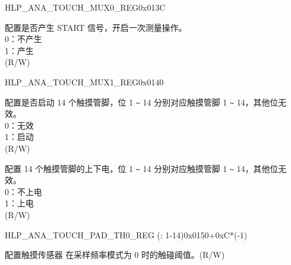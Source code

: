 \addtocounter{Regfloat}{-1}
\begin{register}{H}{LP\_ANA\_TOUCH\_MUX0\_REG}{0x013C}
\begin{regdesc}\begin{reglist}
\item [接上页...]

\label{fielddesc:LPANATOUCHSTARTFORCE}\item [LP\_ANA\_TOUCH\_START\_FORCE] 配置是否产生 START 信号，开启一次测量操作。\\
0：不产生\\
1：产生\\
(R/W)
\end{reglist}\end{regdesc}
\end{register}


\begin{register}{H}{LP\_ANA\_TOUCH\_MUX1\_REG}{0x0140}\label{regdesc:LPANATOUCHMUX1REG}
%
%
%
\regnewline%
\begin{regdesc}\begin{reglist}
\label{fielddesc:LPANATOUCHSTART}\item [LP\_ANA\_TOUCH\_START] 配置是否启动 14 个触摸管脚，位 1 \verb+~+ 14 分别对应触摸管脚 1 \verb+~+ 14，其他位无效。\\
0：无效\\
1：启动\\
(R/W)
\label{fielddesc:LPANATOUCHXPD}\item [LP\_ANA\_TOUCH\_XPD] 配置 14 个触摸管脚的上下电，位 1 \verb+~+ 14 分别对应触摸管脚 1 \verb+~+ 14，其他位无效。\\
0：不上电\\
1：上电\\
(R/W)
\end{reglist}\end{regdesc}
\end{register}


\begin{register}{H}{LP\_ANA\_TOUCH\_PAD\_TH0\_REG (: 1-14)}{0x0150+0xC*(-1)}\label{regdesc:LPANATOUCHPAD0TH0REG}
%
%
\regnewline%
\begin{regdesc}\begin{reglist}
\label{fielddesc:LPANATOUCHPAD0TH0}\item [LP\_ANA\_TOUCH\_PAD\regindex{n}\_TH0] 配置触摸传感器  在采样频率模式为 0 时的触碰阈值。(R/W)
\end{reglist}\end{regdesc}
\end{register}


